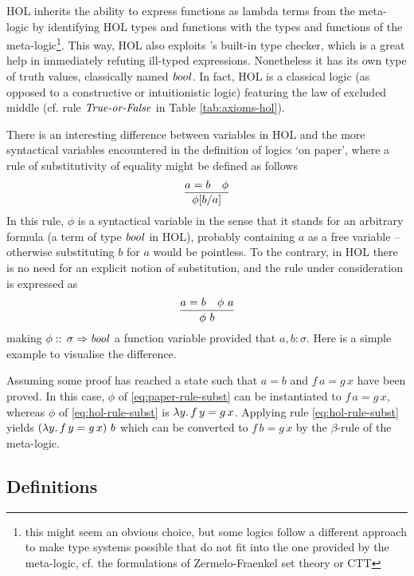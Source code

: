HOL inherits the ability to express functions as lambda terms from the
meta-logic by identifying HOL types and functions with the types and functions
of the meta-logic\footnote{this might seem an obvious choice, but some logics
  follow a different approach to make type systems possible that do not fit into
  the one provided by the meta-logic, cf.  \EG the formulations of
  Zermelo-Fraenkel set theory or CTT}.  This way, HOL also exploits \Isabelle's
built-in type checker, which is a great help in immediately refuting ill-typed
expressions. Nonetheless it has its own type of truth values, classically named
$\mathit{bool}$. In fact, HOL is a classical logic (as opposed to a constructive
or intuitionistic logic) featuring the law of excluded middle (cf. rule
$\mbox{\emph{True-or-False}}$ in Table \ref{tab:axioms-hol}).

There is an interesting difference between variables in HOL and the more
syntactical variables encountered in the definition of logics `on paper', where
a rule of substitutivity of equality might be defined as follows
\begin{equation}
\label{eq:paper-rule-subst}
\frac{\displaystyle a = b\quad \phi}{\displaystyle \phi[b/a]}
\end{equation}
In this rule, $\phi$ is a syntactical variable in the sense that it stands for an
arbitrary formula (\IE a term of type $\mathit{bool}$ in HOL), probably containing
$a$ as a free variable -- otherwise  substituting $b$ for $a$ would be
pointless. To the contrary, in HOL there is no need for an explicit notion of
substitution, and the rule under consideration is expressed as
\begin{equation}
\label{eq:hol-rule-subst}
\frac{\displaystyle a = b \quad \phi\ a}{\displaystyle \phi\ b}
\end{equation}
making $\phi::\, \sigma \Rightarrow \mathit{bool}$ a function variable provided that $a, b : \sigma$. 
Here is a simple example to visualise the difference.
\begin{expl}
  Assuming some proof has reached a state such that $a = b$ and $f\,a = g\,x$
  have been proved. In this case, $\phi$ of \eqref{eq:paper-rule-subst} can be
  instantiated to $f\,a = g\,x$, whereas $\phi$ of \eqref{eq:hol-rule-subst} is
  ${\lambda y.\,f\,y = g\,x}$. Applying rule \eqref{eq:hol-rule-subst} yields
  $({\lambda y.\,f\,y = g\,x})\ b$ which can be converted to $f\,b = g\,x$ by
  the $\beta$-rule of the meta-logic.
\end{expl}



\subsection{Definitions}
\label{sec:hol-definitions}

